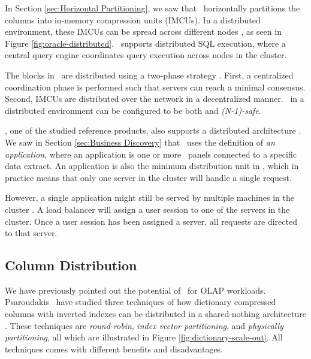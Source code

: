In Section \ref{sec:Horizontal Partitioning}, we saw that \oracle~horizontally partitions the columns into in-memory compression units (IMCUs). In a distributed environment, these IMCUs can be spread across different nodes \cite{Mukherjee2015-ul}, as seen in Figure \ref{fig:oracle-distributed}. \oracle~supports distributed SQL execution, where a central query engine coordinates query execution across nodes in the cluster. 

The blocks in \oracle~are distributed using a two-phase strategy \cite{Mukherjee2015-ul}. First, a centralized coordination phase is performed such that servers can reach a minimal consensus. Second, IMCUs are distributed over the network in a decentralized manner. \oracle~in a distributed environment can be configured to be both and \textit{(N-1)-safe}.

\qlikview, one of the studied reference products, also supports a distributed architecture \cite{Qlik2012-ku}. We saw in Section \ref{sec:Business Discovery} that \qlikview~uses the definition of \textit{an application}, where an application is one or more \bd~panels connected to a specific data extract. An application is also the minimum distribution unit in \qlikview, which in practice means that only one server in the cluster will handle a single request.

However, a single application might still be served by multiple machines in the cluster \cite{Qlik2012-ku}. A load balancer will assign a user session to one of the servers in the cluster. Once a user session has been assigned a server, all requests are directed to that server.

\subsection{Column Distribution}
\label{sub:Column Distribution}
We have previously pointed out the potential of \de~for OLAP workloads. Psaroudakis \ea~have studied three techniques of how dictionary compressed columns with inverted indexes can be distributed in a shared-nothing architecture \cite{Psaroudakis2015-lc}. These techniques are \textit{round-robin}, \textit{index vector partitioning}, and \textit{physically partitioning}, all which are illustrated in Figure \ref{fig:dictionary-scale-out}. All techniques comes with different benefits and disadvantages.

